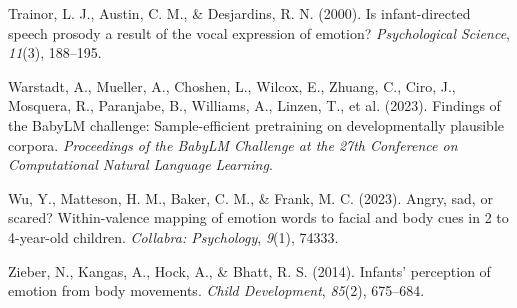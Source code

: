 \documentclass[10pt, letterpaper]{article}
\begin{document}
\begin{CSLReferences}{1}{0}
Trainor, L. J., Austin, C. M., \& Desjardins, R. N. (2000). Is
infant-directed speech prosody a result of the vocal expression of
emotion? \emph{Psychological Science}, \emph{11}(3), 188--195.

Warstadt, A., Mueller, A., Choshen, L., Wilcox, E., Zhuang, C., Ciro,
J., Mosquera, R., Paranjabe, B., Williams, A., Linzen, T., et al.
(2023). Findings of the BabyLM challenge: Sample-efficient pretraining
on developmentally plausible corpora. \emph{Proceedings of the BabyLM
Challenge at the 27th Conference on Computational Natural Language
Learning}.

Wu, Y., Matteson, H. M., Baker, C. M., \& Frank, M. C. (2023). Angry,
sad, or scared? Within-valence mapping of emotion words to facial and
body cues in 2 to 4-year-old children. \emph{Collabra: Psychology},
\emph{9}(1), 74333.

Zieber, N., Kangas, A., Hock, A., \& Bhatt, R. S. (2014). Infants'
perception of emotion from body movements. \emph{Child Development},
\emph{85}(2), 675--684.

\end{CSLReferences}


\end{document}
